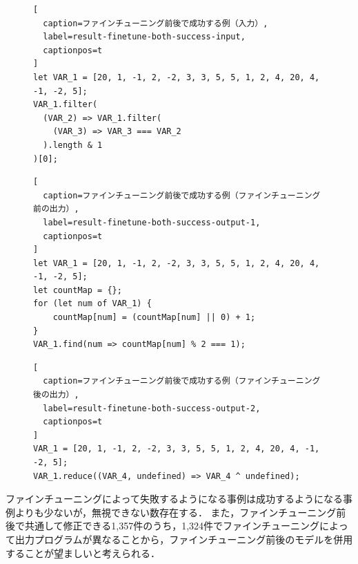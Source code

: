 \documentclass[11pt]{jreport}
\begin{document}
\begin{figure}[t]
\captionsetup{name=Listing}
\hspace{0.04\columnwidth}
\begin{minipage}[b]{0.96\linewidth}
\begin{lstlisting}[
  caption=ファインチューニング前後で成功する例（入力）,
  label=result-finetune-both-success-input,
  captionpos=t
]
let VAR_1 = [20, 1, -1, 2, -2, 3, 3, 5, 5, 1, 2, 4, 20, 4, -1, -2, 5];
VAR_1.filter(
  (VAR_2) => VAR_1.filter(
    (VAR_3) => VAR_3 === VAR_2
  ).length & 1
)[0];
\end{lstlisting}
\end{minipage}

\hspace{0.04\columnwidth}
\begin{minipage}[b]{0.96\linewidth}
\begin{lstlisting}[
  caption=ファインチューニング前後で成功する例（ファインチューニング前の出力）,
  label=result-finetune-both-success-output-1,
  captionpos=t
]
let VAR_1 = [20, 1, -1, 2, -2, 3, 3, 5, 5, 1, 2, 4, 20, 4, -1, -2, 5];
let countMap = {};
for (let num of VAR_1) {
    countMap[num] = (countMap[num] || 0) + 1;
}
VAR_1.find(num => countMap[num] % 2 === 1);
\end{lstlisting}
\end{minipage}

\hspace{0.04\columnwidth}
\begin{minipage}[b]{0.96\linewidth}
\begin{lstlisting}[
  caption=ファインチューニング前後で成功する例（ファインチューニング後の出力）,
  label=result-finetune-both-success-output-2,
  captionpos=t
]
VAR_1 = [20, 1, -1, 2, -2, 3, 3, 5, 5, 1, 2, 4, 20, 4, -1, -2, 5];
VAR_1.reduce((VAR_4, undefined) => VAR_4 ^ undefined);
\end{lstlisting}
\end{minipage}
\end{figure}


ファインチューニングによって失敗するようになる事例は成功するようになる事例よりも少ないが，無視できない数存在する．
また，ファインチューニング前後で共通して修正できる1,357件のうち，1,324件でファインチューニングによって出力プログラムが異なることから，ファインチューニング前後のモデルを併用することが望ましいと考えられる．


\end{document}
